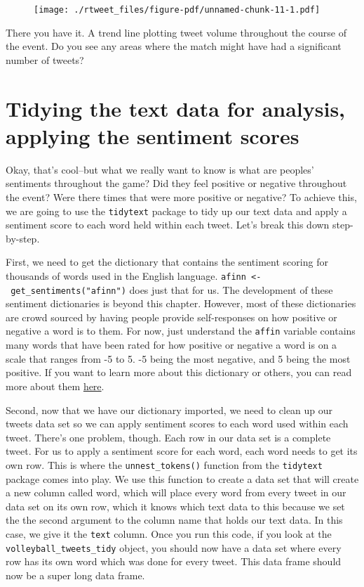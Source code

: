 \documentclass[
  letterpaper,
  DIV=11,
  numbers=noendperiod]{scrreprt}
\begin{document}
\begin{figure}[H]

{\centering \texttt{[image: ./rtweet\_files/figure-pdf/unnamed-chunk-11-1.pdf]}

}

\end{figure}

There you have it. A trend line plotting tweet volume throughout the
course of the event. Do you see any areas where the match might have had
a significant number of tweets?

\hypertarget{tidying-the-text-data-for-analysis-applying-the-sentiment-scores}{%
\section{Tidying the text data for analysis, applying the sentiment
scores}\label{tidying-the-text-data-for-analysis-applying-the-sentiment-scores}}

Okay, that's cool--but what we really want to know is what are peoples'
sentiments throughout the game? Did they feel positive or negative
throughout the event? Were there times that were more positive or
negative? To achieve this, we are going to use the \texttt{tidytext}
package to tidy up our text data and apply a sentiment score to each
word held within each tweet. Let's break this down step-by-step.

First, we need to get the dictionary that contains the sentiment scoring
for thousands of words used in the English language.
\texttt{afinn\ \textless{}-\ get\_sentiments("afinn")} does just that
for us. The development of these sentiment dictionaries is beyond this
chapter. However, most of these dictionaries are crowd sourced by having
people provide self-responses on how positive or negative a word is to
them. For now, just understand the \texttt{affin} variable contains many
words that have been rated for how positive or negative a word is on a
scale that ranges from -5 to 5. -5 being the most negative, and 5 being
the most positive. If you want to learn more about this dictionary or
others, you can read more about them
\href{https://www.tidytextmining.com/sentiment.html}{here}.

Second, now that we have our dictionary imported, we need to clean up
our tweets data set so we can apply sentiment scores to each word used
within each tweet. There's one problem, though. Each row in our data set
is a complete tweet. For us to apply a sentiment score for each word,
each word needs to get its own row. This is where the
\texttt{unnest\_tokens()} function from the \texttt{tidytext} package
comes into play. We use this function to create a data set that will
create a new column called word, which will place every word from every
tweet in our data set on its own row, which it knows which text data to
this because we set the the second argument to the column name that
holds our text data. In this case, we give it the \texttt{text} column.
Once you run this code, if you look at the
\texttt{volleyball\_tweets\_tidy} object, you should now have a data set
where every row has its own word which was done for every tweet. This
data frame should now be a super long data frame.
\end{document}
